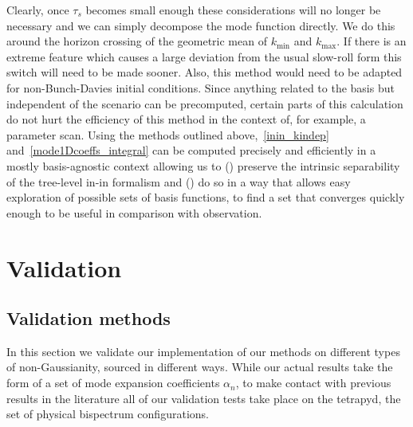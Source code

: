 \documentclass[a4paper,12pt]{extarticle}
\newcommand{\kmin}{{k_\text{min}}}
\newcommand{\kmax}{{k_\text{max}}}
\begin{document}
Clearly, once $\tau_s$ becomes small enough these considerations will no longer be necessary
and we can simply decompose the mode function directly.
We do this around the horizon crossing of the geometric mean of $\kmin$ and $\kmax$.
If there is an extreme feature which causes a large deviation from the usual slow-roll form
this switch will need to be made sooner. 
Also, this method would need to be adapted for non-Bunch-Davies initial conditions.
Since anything related to the basis but independent of the scenario can be
precomputed, certain parts of this calculation do not hurt the efficiency of this
method in the context of, for example, a parameter scan.
Using the methods outlined above,~\eqref{inin_kindep} and~\eqref{mode1Dcoeffs_integral}
can be computed precisely and efficiently in a mostly basis-agnostic context
allowing us to ({}) preserve the intrinsic separability of the tree-level
in-in formalism and ({}) do so in a way that allows easy exploration of possible
sets of basis functions, to find a set that converges quickly enough to
be useful in comparison with observation.


\section{Validation}\label{sec:validation}
\subsection{Validation methods}\label{sec:validation_methods}
In this section we validate our implementation of our methods
on different types of non-Gaussianity, sourced in different ways.
While our actual results take the form of a set of mode expansion coefficients $\alpha_n$,
to make contact with previous results in the literature
all of our validation tests take place on the tetrapyd,
the set of physical bispectrum configurations.
\end{document}
